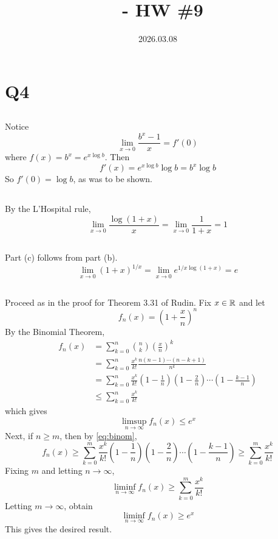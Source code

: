 \documentclass[12pt]{article}
\title{\course\ - HW \#9}
\author{\myname}
\date{2026.03.08}
\begin{document}
\maketitle
\thispagestyle{fancy}


\section*{Q4} 
\subsection{}
Notice 
$$\lim_{x \rightarrow 0} \frac{b^x - 1}{x} = f'(0)$$ 
where $f(x) = b^x = e^{x \log b}$. 
Then 
$$f'(x) = e^{x \log b} \log b = b^x \log b$$
So $f'(0) = \log b$, as was to be shown. 

\subsection{}
By the L'Hospital rule, 
$$\lim_{x \rightarrow 0} \frac{\log(1 + x)}{x} = \lim_{x \rightarrow 0} \frac{1}{1 + x} = 1$$

\subsection{}
Part (c) follows from part (b). 
$$\lim_{x \rightarrow 0} (1 + x)^{1/x} = \lim_{x \rightarrow 0} e^{1/x \log{(1 + x)}} = e$$

\subsection{} 
Proceed as in the proof for Theorem 3.31 of Rudin. 
Fix $x \in \mathbb{R}$ and let 
$$f_n(x) = (1 + \frac{x}{n})^n$$ 
By the Binomial Theorem, 
\begin{align}
  f_n(x) & = \sum_{k = 0}^{n} \binom{n}{k} (\frac{x}{n})^k \nonumber \\ 
         & = \sum_{k = 0}^{n} \frac{x^k}{k!} \frac{n(n - 1) \cdots (n - k + 1)}{n^k} \nonumber \\ 
         & = \sum_{k = 0}^{n} \frac{x^k}{k!} (1 - \frac{1}{n})(1 - \frac{2}{n}) \cdots (1 - \frac{k - 1}{n}) \label{eq:binom} \\ 
         & \leq \sum_{k = 0}^{n} \frac{x^k}{k!} \nonumber
\end{align}
which gives  
$$\limsup_{n \rightarrow \infty} f_n(x) \leq e^x$$ 
Next, if $n \geq m$, then by \eqref{eq:binom},  
$$f_n(x) \geq \sum_{k = 0}^{m} \frac{x^k}{k!} (1 - \frac{1}{n})(1 - \frac{2}{n}) \cdots (1 - \frac{k - 1}{n}) \geq \sum_{k = 0}^{m} \frac{x^k}{k!}$$ 
Fixing $m$ and letting $n \rightarrow \infty$, 
$$\liminf_{n \rightarrow \infty} f_n(x) \geq \sum_{k = 0}^{m} \frac{x^k}{k!}$$
Letting $m \rightarrow \infty$, obtain 
$$\liminf_{n \rightarrow \infty} f_n(x) \geq e^x$$ 
This gives the desired result. 
\end{document}
